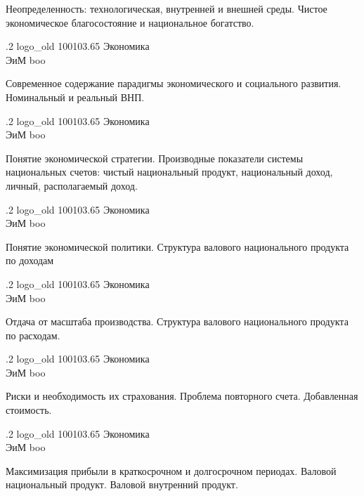 \documentclass[
	12pt,
	a4paper,
	]
	{article}
\newcommand{\shapkFull}{
	\shapk
		{.2}
		{logo_old}
		{100103.65}
		{Экономика\\}
		{ЭиМ}
		{boo}
}
\begin{document}
\z 	Неопределенность: технологическая, внутренней и внешней среды.
 \medskip
\z 	Чистое экономическое благосостояние и национальное богатство.
 \medskip

\newpage


\shapkFull
\setcounter{zad}{0}

\z 	Современное содержание парадигмы экономического и социального развития.
 \medskip
\z 	Номинальный и реальный ВНП.
 \medskip

\newpage


\shapkFull
\setcounter{zad}{0}

\z 	Понятие экономической стратегии.
 \medskip
\z 	Производные показатели системы национальных счетов: чистый национальный продукт, национальный доход, личный, располагаемый доход.
 \medskip

\newpage


\shapkFull
\setcounter{zad}{0}

\z 	Понятие экономической политики.
 \medskip
\z 	Структура валового национального продукта по доходам
 \medskip

\newpage


\shapkFull
\setcounter{zad}{0}

\z 	Отдача от масштаба производства.
 \medskip
\z 	Структура валового национального продукта по расходам.
 \medskip

\newpage


\shapkFull
\setcounter{zad}{0}

\z 	Риски и необходимость их страхования.
 \medskip
\z 	Проблема повторного счета. Добавленная стоимость.
 \medskip

\newpage


\shapkFull
\setcounter{zad}{0}

\z 	Максимизация прибыли в краткосрочном и долгосрочном периодах.
 \medskip
\z 	Валовой национальный продукт.  Валовой внутренний продукт.
 \medskip

\newpage
\end{document}
